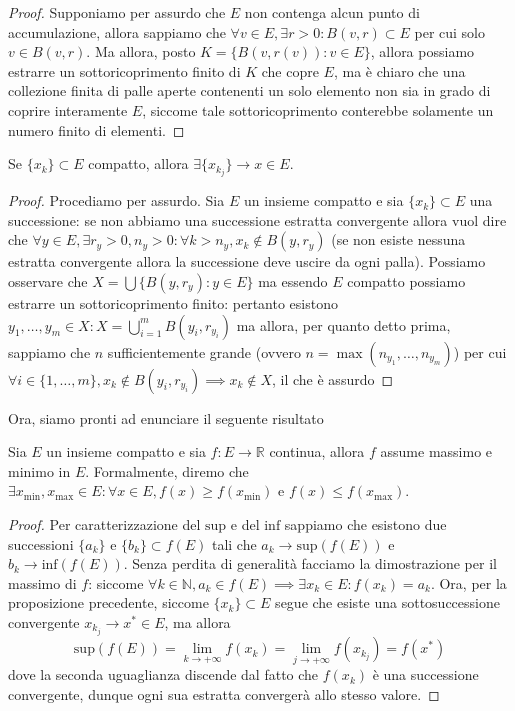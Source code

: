 \documentclass[12pt, twoside, italian, openany]{book}
\begin{document}
	\begin{proof}
		Supponiamo per assurdo che $E$ non contenga alcun punto di accumulazione, allora sappiamo che $\forall v \in E, \exists r > 0: B(v, r) \subset E$ per cui solo $v \in B(v, r)$. Ma allora, posto $K = \{ B(v, r(v)) : v \in E \}$, allora possiamo
		estrarre un sottoricoprimento finito di $K$ che copre $E$, ma è chiaro che una collezione finita di palle aperte contenenti un solo elemento non sia in grado di coprire interamente $E$, siccome tale sottoricoprimento conterebbe solamente un numero finito di elementi.
	\end{proof}
	\begin{cor}
		Se $\{ x_k \} \subset E$ compatto, allora $\exists \{ x_{k_j} \} \to x \in E$.
	\end{cor}
	\begin{proof}
		Procediamo per assurdo. Sia $E$ un insieme compatto e sia $\{ x_k \} \subset E$ una successione: se non abbiamo una successione estratta convergente allora vuol dire che $\forall y \in E, \exists r_y > 0, n_y > 0 : \forall k > n_y, x_k \not\in B(y, r_y)$ (se non esiste nessuna estratta convergente allora la successione deve uscire da ogni palla). 
		Possiamo osservare che $X = \bigcup \{ B(y, r_y) : y \in E\}$ ma essendo $E$ compatto possiamo estrarre un sottoricoprimento finito: pertanto esistono $y_1, \ldots, y_m \in X : X = \bigcup\limits_{i=1}^m B(y_i, r_{y_i})$ ma allora, per quanto detto prima, sappiamo che $n$ sufficientemente grande (ovvero $n = \max{(n_{y_1}, \ldots, n_{y_m})}$) per cui $\forall i \in \{ 1, \ldots, m \}, x_k \not\in B(y_i, r_{y_i}) \implies x_k \not\in X$, il che è assurdo 
	\end{proof}
	Ora, siamo pronti ad enunciare il seguente risultato
	\begin{theorem}
		Sia $E$ un insieme compatto e sia $f: E \to \mathbb{R}$ continua, allora $f$ assume massimo e minimo in $E$. Formalmente, diremo che $\exists x_\text{min}, x_\text{max} \in E : \forall x \in E, f(x) \geq f(x_\text{min})$ e $f(x) \leq f(x_\text{max})$. 
	\end{theorem}
	\begin{proof}
		Per caratterizzazione del $\text{sup}$ e del $\text{inf}$ sappiamo che esistono due successioni $\{ a_k \}$ e $\{ b_k \} \subset f(E)$ tali che $a_k \to \text{sup}(f(E))$ e $b_k \to \text{inf}(f(E))$. Senza perdita di generalità facciamo la dimostrazione per il massimo di $f$: siccome $\forall k \in \mathbb{N}, a_k \in f(E) \implies \exists x_k \in E : f(x_k) = a_k$. Ora, per la proposizione precedente, siccome $\{ x_k \} \subset E$ segue che esiste una sottosuccessione convergente $x_{k_j} \to x^* \in E$, ma allora
		$$
			\text{sup}(f(E)) = \lim_{k \to +\infty} f(x_k) = \lim_{j \to +\infty} f(x_{k_j}) = f(x^*)  
		$$
		dove la seconda uguaglianza discende dal fatto che $f(x_k)$ è una successione convergente, dunque ogni sua estratta convergerà allo stesso valore. 
	\end{proof}
\end{document}
